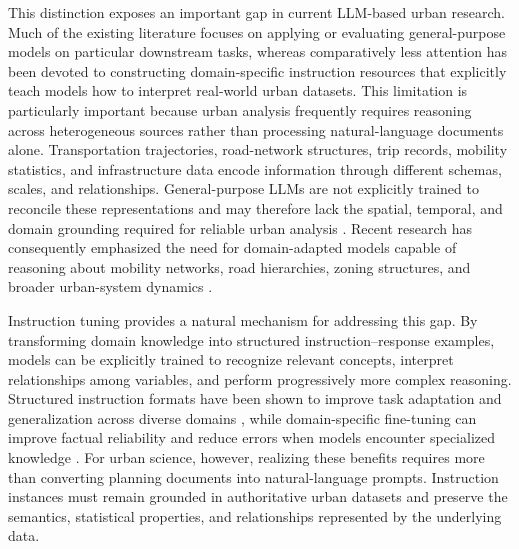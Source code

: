 \documentclass[a4paper,fleqn]{cas-sc}
\begin{document}
This distinction exposes an important gap in current LLM-based urban research. Much of the existing literature focuses on applying or evaluating general-purpose models on particular downstream tasks, whereas comparatively less attention has been devoted to constructing domain-specific instruction resources that explicitly teach models how to interpret real-world urban datasets. This limitation is particularly important because urban analysis frequently requires reasoning across heterogeneous sources rather than processing natural-language documents alone. Transportation trajectories, road-network structures, trip records, mobility statistics, and infrastructure data encode information through different schemas, scales, and relationships. General-purpose LLMs are not explicitly trained to reconcile these representations and may therefore lack the spatial, temporal, and domain grounding required for reliable urban analysis \cite{montoya2023urbanai, liu2023review}. Recent research has consequently emphasized the need for domain-adapted models capable of reasoning about mobility networks, road hierarchies, zoning structures, and broader urban-system dynamics \cite{xu2024llmurban, park2024llm4city}.

Instruction tuning provides a natural mechanism for addressing this gap. By transforming domain knowledge into structured instruction--response examples, models can be explicitly trained to recognize relevant concepts, interpret relationships among variables, and perform progressively more complex reasoning. Structured instruction formats have been shown to improve task adaptation and generalization across diverse domains \cite{wang2022supernaturalinstructions, longpre2023flan}, while domain-specific fine-tuning can improve factual reliability and reduce errors when models encounter specialized knowledge \cite{chung2022scaling, zhou2023lima}. For urban science, however, realizing these benefits requires more than converting planning documents into natural-language prompts. Instruction instances must remain grounded in authoritative urban datasets and preserve the semantics, statistical properties, and relationships represented by the underlying data.
\end{document}
